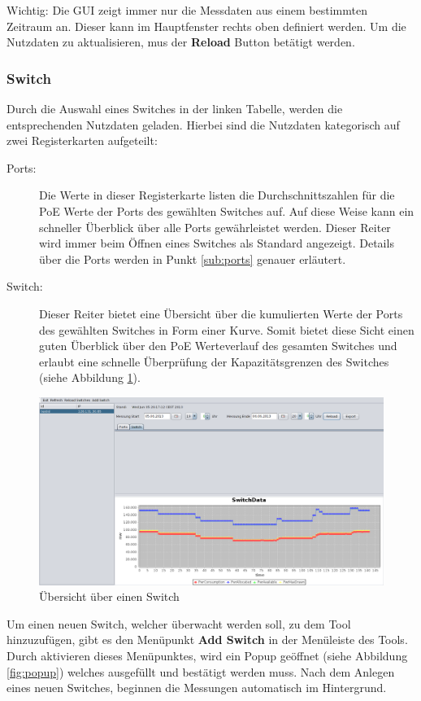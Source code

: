 Wichtig: Die GUI zeigt immer nur die Messdaten aus einem bestimmten Zeitraum an. Dieser kann im Hauptfenster rechts oben definiert werden. Um die Nutzdaten zu aktualisieren, mus der \textbf{Reload} Button betätigt werden.

\subsubsection{Switch}
Durch die Auswahl eines Switches in der linken Tabelle, werden die entsprechenden Nutzdaten geladen. Hierbei sind die Nutzdaten kategorisch auf zwei Registerkarten aufgeteilt:
\begin{description}
 \item[Ports:] Die Werte in dieser Registerkarte listen die Durchschnittszahlen für die PoE Werte der Ports des gewählten Switches auf. Auf diese Weise kann ein schneller Überblick über alle Ports gewährleistet werden. Dieser Reiter wird immer beim Öffnen eines Switches als Standard angezeigt. Details über die Ports werden in Punkt \ref{sub:ports} genauer erläutert.
 \item[Switch:] Dieser Reiter bietet eine Übersicht über die kumulierten Werte der Ports des gewählten Switches in Form einer Kurve. Somit bietet diese Sicht einen guten Überblick über den PoE Werteverlauf des gesamten Switches und erlaubt eine schnelle Überprüfung der Kapazitätsgrenzen des Switches (siehe Abbildung \ref{fig:overview-switch}).
\end{description}

\begin{figure}[h]
    \centering
    \leavevmode
    \includegraphics[width=1.0\linewidth]{figures/switchDetails}
    \caption{Übersicht über einen Switch}
    \label{fig:overview-switch}
\end{figure}

Um einen neuen Switch, welcher überwacht werden soll, zu dem Tool hinzuzufügen, gibt es den Menüpunkt \textbf{Add Switch} in der Menüleiste des Tools. Durch aktivieren dieses Menüpunktes, wird ein Popup geöffnet (siehe Abbildung \ref{fig:popup}) welches ausgefüllt und bestätigt werden muss. Nach dem Anlegen eines neuen Switches, beginnen die Messungen automatisch im Hintergrund.

